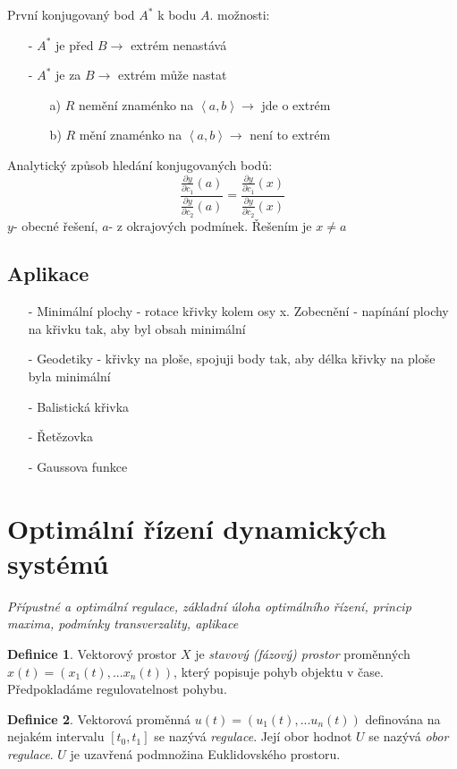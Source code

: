 \documentclass[a4]{report}
\theoremstyle{definition}
\newtheorem{definition}{Definice}[section]
\begin{document}
{První konjugovaný bod $A^{*}$ k bodu $A$.
 možnosti:
  \begin{enumerate}
\item[-] $A^{*}$ je před $B \rightarrow$ extrém nenastává
\item[-] $A^{*}$ je za $B \rightarrow$ extrém může nastat \begin{enumerate}
\item[a)] $R$ nemění znaménko na $\left \langle a,b \right \rangle \rightarrow$ jde o extrém
\item[b)] $R$ mění znaménko na $\left \langle a,b \right \rangle \rightarrow$ není to extrém 
\end{enumerate}

\end{enumerate}

Analytický způsob hledání konjugovaných bodů:
$$ \frac{\frac{\partial y}{\partial c_{1}}(a)}{\frac{\partial y}{\partial c_{2}}(a)}=\frac{\frac{\partial y}{\partial c_{1}}(x)}{\frac{\partial y}{\partial c_{2}}(x)}$$
$y$- obecné řešení, $a$- z okrajových podmínek. Řešením je $x\neq a$

\subsection{Aplikace}
\begin{enumerate}
\item[-]Minimální plochy - rotace křivky kolem osy x. Zobecnění - napínání plochy na křivku tak, aby byl obsah minimální
\item[-]Geodetiky - křivky na ploše, spojuji body tak, aby délka křivky na ploše byla minimální
\item[-]Balistická křivka
\item[-]Řetězovka
\item[-]Gaussova funkce
\end{enumerate}

\section{Optimální řízení dynamických systémú}

\textit{Přípustné a optimální regulace, základní úloha optimálního řízení, princip maxima, podmínky transverzality, aplikace}\\

\begin{definition}
Vektorový prostor $X$ je \textit{stavový (fázový) prostor} proměnných $x(t)=(x_1(t),...x_n(t))$, který popisuje pohyb objektu v čase. Předpokladáme regulovatelnost pohybu.
\end{definition}
\begin{definition}
Vektorová proměnná $u(t)=(u_1(t),...u_n(t))$ definována na nejakém intervalu $[t_0,t_1]$ se nazývá \textit{regulace}. Její obor hodnot $U$ se nazývá \textit{obor regulace}. $U$ je uzavřená podmnožina Euklidovského prostoru.
\end{definition}

}
\end{document}
